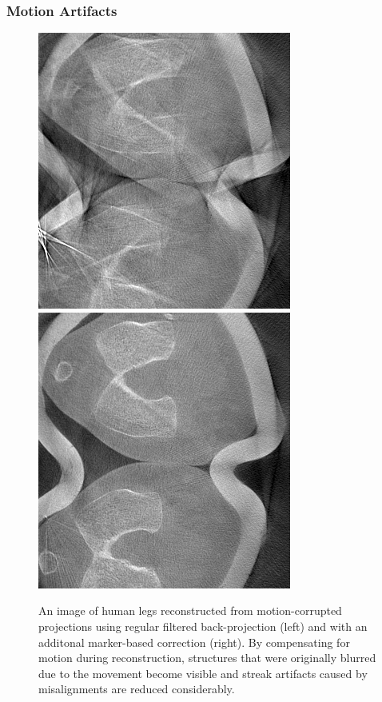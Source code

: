 \begin{frame}
	\frametitle{Motion Artifacts}

	\begin{figure}[tbp]
		\centering
		\includegraphics[height=0.7\textheight]{images/motion_1}
		\hspace{1cm}
		\includegraphics[height=0.7\textheight]{images/motion_2}
		\caption{An image of human legs reconstructed from motion-corrupted projections using regular filtered back-projection (left) and with an additonal marker-based correction (right). By compensating for motion during reconstruction, structures that were originally blurred due to the movement become visible and streak artifacts caused by misalignments are reduced considerably.}%
		\label{fig:ct_motion}
	\end{figure}

\end{frame}

